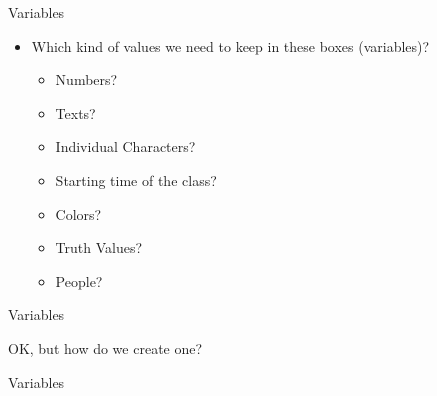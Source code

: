 		\begin{frame}{Variables}
			\LARGE
			\begin{itemize}
				\item Which kind of values we need to keep in these boxes (variables)?
				\pause
					\begin{itemize}
						\Large
						\item Numbers?
						\pause
						\item Texts?
						\pause
						\item Individual Characters?
						\pause
						\item Starting time of the class?
						\pause
						\item Colors?
						\pause
						\item Truth Values?
						\pause
						\item People?
					\end{itemize} 
			\end{itemize}
		\end{frame}

		\begin{frame}{Variables}
			\LARGE
			\begin{table}[]
			\end{table}
			\pause
			OK, but how do we create one?
		\end{frame}

		\begin{frame}{Variables}
			\inputminted[frame=single,framesep=2pt,fontsize=\LARGE]{python3}{code-examples/variables.py}
		\end{frame}
		
